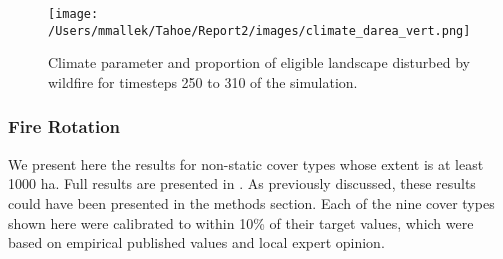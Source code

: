 \begin{figure}[!htbp]
\centering
\texttt{[image: /Users/mmallek/Tahoe/Report2/images/climate\_darea\_vert.png]}
\caption{Climate parameter and proportion of eligible landscape disturbed by wildfire for timesteps 250 to 310 of the simulation.}
\label{fig:compare_clim_darea}
\end{figure}


\newpage
\subsubsection{Fire Rotation}
We present here the results for non-static cover types whose extent is at least 1000 ha. Full results are presented in . As previously discussed, these results could have been presented in the methods section. Each of the nine cover types shown here were calibrated to within 10\% of their target values, which were based on empirical published values and local expert opinion.

